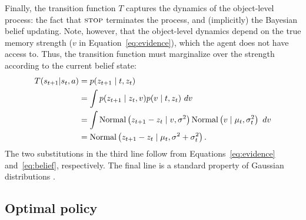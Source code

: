Finally, the transition function $T$ captures the dynamics of the object-level process: the fact that $\textsc{stop}$ terminates the process, and (implicitly) the Bayesian belief updating. Note, however, that the object-level dynamics depend on the true memory strength ($v$ in Equation~\ref{eq:evidence}), which the agent does not have access to. Thus, the transition function must marginalize over the strength according to the current belief state:
%
\begin{equation}\label{eq:transition}
\begin{aligned}
  T(s_{t+1} | s_t, a) 
  &= p(z_{t+1} \mid t, z_t) \\
  &= \int p(z_{t+1} \mid z_t, v) p(v \mid t, z_t) \ dv \\
  &= \int \mathrm{Normal}\left( z_{t+1} - z_t \mid v, \sigma^2 \right) 
          \mathrm{Normal}\left( v \mid \mu_t, \sigma_t^2 \right)\ dv \\
  &= \mathrm{Normal}\left( z_{t+1} - z_t \mid \mu_t, \sigma^2 + \sigma_t^2 \right).
\end{aligned}
\end{equation}
%
The two substitutions in the third line follow from Equations~\ref{eq:evidence} and~\ref{eq:belief}, respectively. The final line is a standard property of Gaussian distributions \citep{murphy2007conjugate}.


\subsection{Optimal policy}

